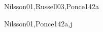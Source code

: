 \begin{syllabus}
\begin{unit}{\ISAgents}{}{Nilsson01,Russell03,Ponce14}{2}{a}
\begin{topics}
    \item \ISAgentsTopicDefinitions
    \item \ISAgentsTopicAgent
    \item \ISAgentsTopicAgentTheory
    \item \ISAgentsTopicRationality
    \item \ISAgentsTopicSoftware
    \item \ISAgentsTopicLearning
    \item \ISAgentsTopicMulti
\end{topics}
\begin{learningoutcomes}
    \item \ISAgentsLOListTheOf [\Usage]
    \item \ISAgentsLOCharacterizeAnd [\Usage]
    \item \ISAgentsLODescribeTheAgent [\Usage]
    \item \ISAgentsLODescribeTheUsed [\Usage]
    \item \ISAgentsLODemonstrateUsingHow [\Usage]
\end{learningoutcomes}
\end{unit}

\begin{unit}{\ISBasicSearchStrategies}{}{Nilsson01,Ponce14}{2}{a,j}
\begin{topics}
    \item \ISBasicSearchStrategiesTopicProblemSpaces
    \item \ISBasicSearchStrategiesTopicFactored
    \item \ISBasicSearchStrategiesTopicUninformed
    \item \ISBasicSearchStrategiesTopicHeuristics
    \item \ISBasicSearchStrategiesTopicSpace
    \item \ISBasicSearchStrategiesTopicTwo
    \item \ISBasicSearchStrategiesTopicConstraint
\end{topics}
\begin{learningoutcomes}
    \item \ISBasicSearchStrategiesLOFormulate [\Usage]
    \item \ISBasicSearchStrategiesLODescribeTheHeuristics [\Usage]
    \item \ISBasicSearchStrategiesLODescribeTheCombinatorial [\Usage]
    \item \ISBasicSearchStrategiesLOCompareAndSearch [\Usage]
\end{learningoutcomes}
\end{unit}


\end{syllabus}
